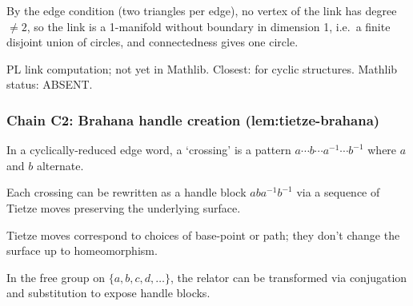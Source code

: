 \begin{lemma}
\label{lem:rvl-r4}
By the edge condition (two triangles per edge), no vertex of the link has degree $\neq 2$, so the link is a 1-manifold without boundary in dimension 1, i.e.\ a finite disjoint union of circles, and connectedness gives one circle.
\leanok
\end{lemma}

\begin{lemma}
\label{lem:rvl-r5}
PL link computation; not yet in Mathlib.  Closest:  for cyclic structures.  Mathlib status: ABSENT.
\leanok
\end{lemma}

\subsubsection*{Chain C2: Brahana handle creation (lem:tietze-brahana)}

\begin{lemma}
\label{lem:tbh-r1}
In a cyclically-reduced edge word, a `crossing' is a pattern $a \cdots b \cdots a^{-1} \cdots b^{-1}$ where $a$ and $b$ alternate.
\leanok
\end{lemma}

\begin{lemma}
\label{lem:tbh-r2}
Each crossing can be rewritten as a handle block $aba^{-1}b^{-1}$ via a sequence of Tietze moves preserving the underlying surface.
\leanok
\end{lemma}

\begin{lemma}
\label{lem:tbh-r3}
Tietze moves correspond to choices of base-point or path; they don't change the surface up to homeomorphism.
\leanok
\end{lemma}

\begin{lemma}
\label{lem:tbh-r4}
In the free group on $\{a, b, c, d, \ldots\}$, the relator can be transformed via conjugation and substitution to expose handle blocks.
\leanok
\end{lemma}

